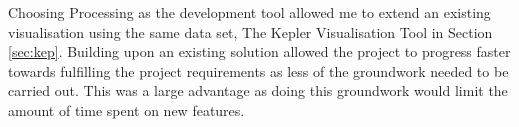 Choosing Processing as the development tool allowed me to extend an existing visualisation
using the same data set, The Kepler Visualisation Tool in Section \ref{sec:kep}.
Building upon an existing solution allowed the project to progress faster
towards fulfilling the project requirements as less of the groundwork needed to
be carried out. This was a large advantage as doing this groundwork would limit
the amount of time spent on new features.


